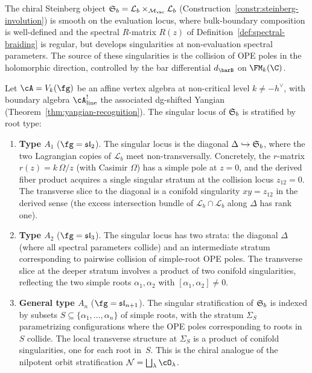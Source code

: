 The chiral Steinberg object
$\mathfrak{S}_b = \mathcal{L}_b \times_{{\mathcal{M}_{\mathrm{vac}}}} \mathcal{L}_b$
(Construction~\ref{constr:steinberg-involution}) is smooth on the
evaluation locus, where bulk-boundary composition is well-defined
and the spectral $R$-matrix $R(z)$ of
Definition~\ref{def:spectral-braiding} is regular, but develops
singularities at non-evaluation spectral parameters. The source
of these singularities is the collision of OPE poles in the
holomorphic direction, controlled by the bar differential $d_{\barB}$
on $\FM_k(\C)$.

\begin{conjecture}
\label{conj:singular-locus}
Let $\cA = V_k(\fg)$ be an affine vertex algebra at non-critical
level $k \neq -h^\vee$, with boundary algebra
$\cA^!_{\mathrm{line}}$ the associated dg-shifted Yangian
\textup{(}Theorem~\textup{\ref{thm:yangian-recognition})}.
The singular locus of $\mathfrak{S}_b$ is stratified by root type:
\begin{enumerate}[label=\textup{(\alph*)}]
\item \textbf{Type $A_1$} ($\fg = \fsl_2$).
 The singular locus is the diagonal
 $\Delta \hookrightarrow \mathfrak{S}_b$, where the two Lagrangian
 copies of $\mathcal{L}_b$ meet non-transversally. Concretely,
 the $r$-matrix $r(z) = k\,\Omega/z$ (with Casimir $\Omega$) has a
 simple pole at $z = 0$, and the derived fiber product acquires a
 single singular stratum at the collision locus $z_{12} = 0$.
 The transverse slice to the diagonal is a conifold singularity
 $xy = z_{12}$ in the derived sense (the excess intersection bundle
 of $\mathcal{L}_b \cap \mathcal{L}_b$ along $\Delta$ has rank one).

\item \textbf{Type $A_2$} ($\fg = \fsl_3$).
 The singular locus has two strata: the diagonal $\Delta$ (where all
 spectral parameters collide) and an intermediate stratum
 corresponding to pairwise collision of simple-root OPE poles.
 The transverse slice at the deeper stratum involves
 a product of two conifold singularities, reflecting the two simple
 roots $\alpha_1, \alpha_2$ with $[\alpha_1, \alpha_2] \neq 0$.

\item \textbf{General type $A_n$} ($\fg = \fsl_{n+1}$).
 The singular stratification of $\mathfrak{S}_b$ is indexed by
 subsets $S \subseteq \{\alpha_1, \ldots, \alpha_n\}$ of simple roots,
 with the stratum $\Sigma_S$ parametrizing configurations where the OPE
 poles corresponding to roots in $S$ collide. The local transverse
 structure at $\Sigma_S$ is a product of conifold singularities,
 one for each root in~$S$. This is the chiral analogue of the
 nilpotent orbit stratification $\cN = \bigsqcup_\lambda \cO_\lambda$.
\end{enumerate}
\end{conjecture}

